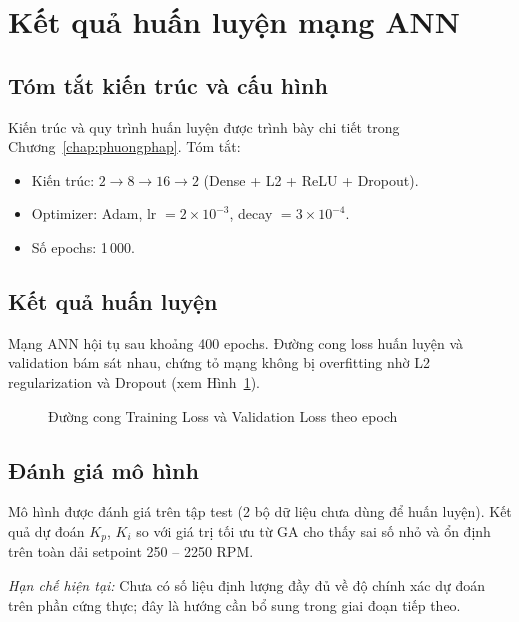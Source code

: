 \section{Kết quả huấn luyện mạng ANN}

\subsection{Tóm tắt kiến trúc và cấu hình}

Kiến trúc và quy trình huấn luyện được trình bày chi tiết trong
Chương~\ref{chap:phuongphap}. Tóm tắt:
\begin{itemize}
    \item Kiến trúc: $2 \to 8 \to 16 \to 2$ (Dense + L2 + ReLU + Dropout).
    \item Optimizer: Adam, lr $= 2\times10^{-3}$, decay $= 3\times10^{-4}$.
    \item Số epochs: 1\,000.
\end{itemize}

\subsection{Kết quả huấn luyện}

Mạng ANN hội tụ sau khoảng 400 epochs. Đường cong loss huấn luyện và validation
bám sát nhau, chứng tỏ mạng không bị overfitting nhờ L2 regularization và Dropout
(xem Hình~\ref{fig:loss_curve}).

\begin{figure}[H]
    \centering
    \caption{Đường cong Training Loss và Validation Loss theo epoch}
    \label{fig:loss_curve}
\end{figure}

\subsection{Đánh giá mô hình}

Mô hình được đánh giá trên tập test (2 bộ dữ liệu chưa dùng để huấn luyện).
Kết quả dự đoán $K_p$, $K_i$ so với giá trị tối ưu từ GA cho thấy sai số nhỏ
và ổn định trên toàn dải setpoint 250 -- 2250 RPM.

\textit{Hạn chế hiện tại:} Chưa có số liệu định lượng đầy đủ về độ chính xác dự đoán
trên phần cứng thực; đây là hướng cần bổ sung trong giai đoạn tiếp theo.


